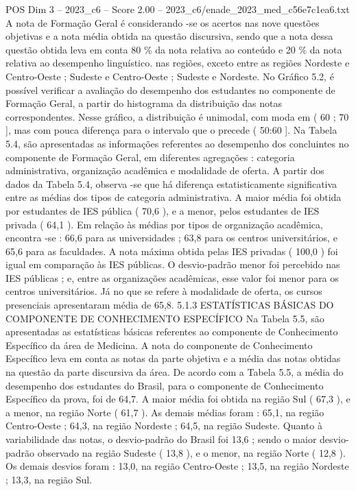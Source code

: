 \begin{textsample}{POS Dim 3 – 2023\_c6 – Score 2.00 – 2023\_c6/enade\_2023\_med\_c56e7c1ea6.txt}
A nota de Formação Geral é considerando -se os acertos nas nove questões objetivas e a nota média obtida na questão discursiva, sendo que a nota dessa questão obtida leva em conta 80 \% da nota relativa ao conteúdo e 20 \% da nota relativa ao desempenho linguístico. nas regiões, exceto entre as regiões Nordeste e Centro-Oeste ; Sudeste e Centro-Oeste ; Sudeste e Nordeste.
No Gráfico 5.2, é possível verificar a avaliação do desempenho dos estudantes no componente de Formação Geral, a partir do histograma da distribuição das notas correspondentes.
Nesse gráfico, a distribuição é unimodal, com moda em ( 60 ; 70 ], mas com pouca diferença para o intervalo que o precede ( 50:60 ].
Na Tabela 5.4, são apresentadas as informações referentes ao desempenho dos concluintes no componente de Formação Geral, em diferentes agregações : categoria administrativa, organização acadêmica e modalidade de oferta.
A partir dos dados da Tabela 5.4, observa -se que há diferença estatisticamente significativa entre as médias dos tipos de categoria administrativa.
A maior média foi obtida por estudantes de IES pública ( 70,6 ), e a menor, pelos estudantes de IES privada ( 64,1 ).
Em relação às médias por tipos de organização acadêmica, encontra -se : 66,6 para as universidades ; 63,8 para os centros universitários, e 65,6 para as faculdades.
A nota máxima obtida pelas IES privadas ( 100,0 ) foi igual em comparação às IES públicas.
O desvio-padrão menor foi percebido nas IES públicas ; e, entre as organizações acadêmicas, esse valor foi menor para os centros universitários.
Já no que se refere à modalidade de oferta, os cursos presenciais apresentaram média de 65,8. 5.1.3 ESTATÍSTICAS BÁSICAS DO COMPONENTE DE CONHECIMENTO ESPECÍFICO Na Tabela 5.5, são apresentadas as estatísticas básicas referentes ao componente de Conhecimento Específico da área de Medicina.
A nota do componente de Conhecimento Específico leva em conta as notas da parte objetiva e a média das notas obtidas na questão da parte discursiva da área.
De acordo com a Tabela 5.5, a média do desempenho dos estudantes do Brasil, para o componente de Conhecimento Específico da prova, foi de 64,7.
A maior média foi obtida na região Sul ( 67,3 ), e a menor, na região Norte ( 61,7 ).
As demais médias foram : 65,1, na região Centro-Oeste ; 64,3, na região Nordeste ; 64,5, na região Sudeste.
Quanto à variabilidade das notas, o desvio-padrão do Brasil foi 13,6 ; sendo o maior desvio-padrão observado na região Sudeste ( 13,8 ), e o menor, na região Norte ( 12,8 ).
Os demais desvios foram : 13,0, na região Centro-Oeste ; 13,5, na região Nordeste ; 13,3, na região Sul.

\end{textsample}
